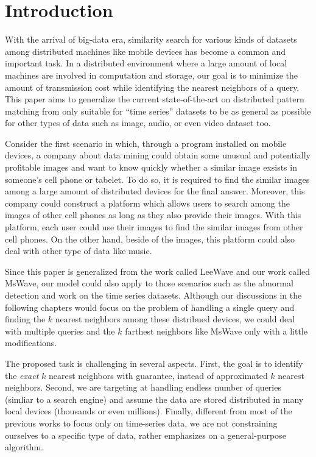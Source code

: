 \chapter{Introduction}
\label{c:intro}

With the arrival of big-data era, similarity search for various kinds of datasets among distributed machines like mobile devices has become a common and important task.  In a distributed environment where a large amount of local machines are involved in computation and storage, our goal is to minimize the amount of transmission cost while identifying the nearest neighbors of a query. This paper aims to generalize the current state-of-the-art on distributed pattern matching from only suitable for ``time series''  datasets to be as general as possible for other types of data such as image, audio, or even video dataset too.


Consider the first scenario in which, through a program installed on mobile devices, a company about data mining could obtain some unusual and potentially profitable images and want to know quickly whether a similar image exsists in someone's cell phone or tabelet.  To do so, it is required to find the similar images among a large amount of distributed devices for the final answer.  Moreover, this company could construct a platform which allows users to search among the images of other cell phones as long as they also provide their images.  With this platform, each user could use their images to find the similar images from other cell phones.  On the other hand, beside of the images, this platform could also deal with other type of data like music.  

Since this paper is generalized from the work \cite{LeeWave} called LeeWave and our work \cite{MsWave} called MsWave, our model could also apply to those scenarios such as the abnormal detection and work on the time series datasets. Although our discussions in the following chapters would focus on the problem of handling a single query and finding the $k$ nearest neighbors among these distribued devices, we could deal with multiple queries and the $k$ farthest neighbors like MsWave only with a little modifications.

The proposed task is challenging in several aspects. First, the goal is to identify the \emph{exact} $k$ nearest neighbors with guarantee, instead of approximated $k$ nearest neighbors.  Second, we are targeting at handling endless number of queries (simliar to a search engine) and assume the data are stored distributed in many local devices (thousands or even millions).  Finally, different from most of the previous works to focus only on time-series data, we are not constraining ourselves to a specific type of data, rather emphasizes on a general-purpose algorithm.


